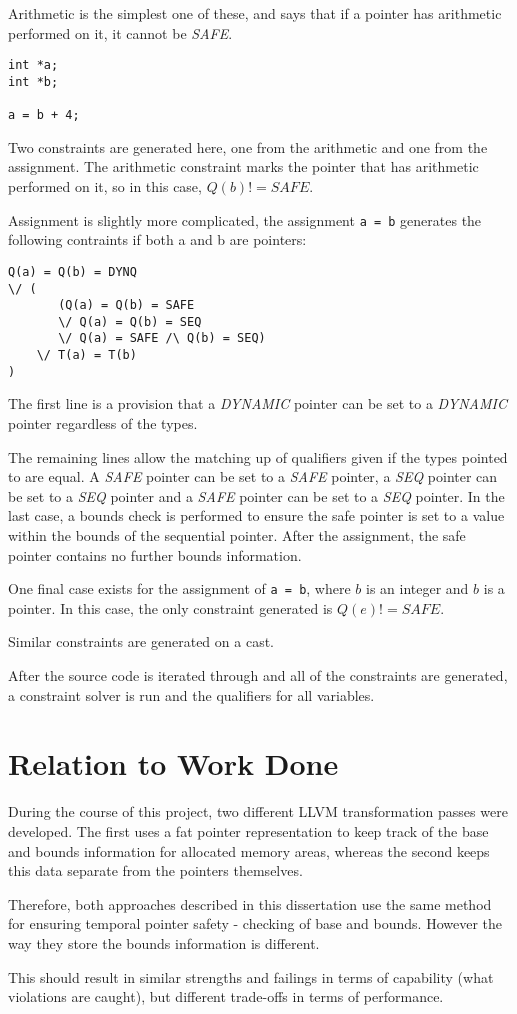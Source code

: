 Arithmetic is the simplest one of these, and says that if a pointer has arithmetic performed on it, it cannot be \textit{SAFE}.

\begin{verbatim}
int *a;
int *b;

a = b + 4;
\end{verbatim}

Two constraints are generated here, one from the arithmetic and one from the assignment.
The arithmetic constraint marks the pointer that has arithmetic performed on it, so in this case, $Q(b) != SAFE$.

Assignment is slightly more complicated, the assignment \verb|a = b| generates the following contraints if both a and b are pointers:

\begin{verbatim}
Q(a) = Q(b) = DYNQ 
\/ (
       (Q(a) = Q(b) = SAFE 
       \/ Q(a) = Q(b) = SEQ
       \/ Q(a) = SAFE /\ Q(b) = SEQ) 
    \/ T(a) = T(b)
)
\end{verbatim}

The first line is a provision that a \textit{DYNAMIC} pointer can be set to a \textit{DYNAMIC} pointer regardless of the types.

The remaining lines allow the matching up of qualifiers given if the types pointed to are equal.
A \textit{SAFE} pointer can be set to a \textit{SAFE} pointer, a \textit{SEQ} pointer can be set to a \textit{SEQ} pointer and a \textit{SAFE} pointer can be set to a \textit{SEQ} pointer.
In the last case, a bounds check is performed to ensure the safe pointer is set to a value within the bounds of the sequential pointer.
After the assignment, the safe pointer contains no further bounds information.

One final case exists for the assignment of \verb|a = b|, where $b$ is an integer and $b$ is a pointer.
In this case, the only constraint generated is $Q(e) != SAFE$.

Similar constraints are generated on a cast.

After the source code is iterated through and all of the constraints are generated, a constraint solver is run and the qualifiers for all variables.



\section{Relation to Work Done}

During the course of this project, two different LLVM transformation passes were developed.
The first uses a fat pointer representation to keep track of the base and bounds information for allocated memory areas, whereas the second keeps this data separate from the pointers themselves.

Therefore, both approaches described in this dissertation use the same method for ensuring temporal pointer safety - checking of base and bounds.
However the way they store the bounds information is different.

This should result in similar strengths and failings in terms of capability (what violations are caught), but different trade-offs in terms of performance.

